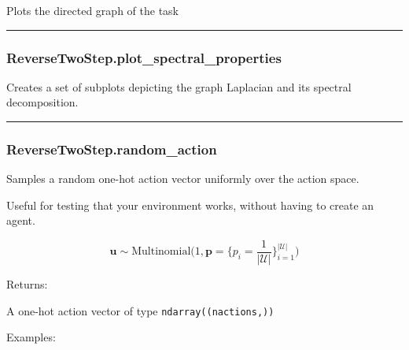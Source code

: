Plots the directed graph of the task

\begin{center}\rule{0.5\linewidth}{\linethickness}\end{center}

\subsubsection{ReverseTwoStep.plot\_spectral\_properties}\label{reversetwostep.plot_spectral_properties}

\begin{Shaded}
\begin{Highlighting}[]
\OperatorTok{=}\OperatorTok{=}\OperatorTok{=}\NormalTok{)}
\end{Highlighting}
\end{Shaded}

Creates a set of subplots depicting the graph Laplacian and its spectral
decomposition.

\begin{center}\rule{0.5\linewidth}{\linethickness}\end{center}

\subsubsection{ReverseTwoStep.random\_action}\label{reversetwostep.random_action}

\begin{Shaded}
\begin{Highlighting}[]
\NormalTok{)}
\end{Highlighting}
\end{Shaded}

Samples a random one-hot action vector uniformly over the action space.

Useful for testing that your environment works, without having to create
an agent.

\[
\mathbf u \sim \mathrm{Multinomial}\Big(1, \mathbf p=\{p_i = \frac{1}{|\mathcal U|}\}_{i=1}^{|\mathcal U|}\Big)
\]

Returns:

A one-hot action vector of type \texttt{ndarray((nactions,))}

Examples:

